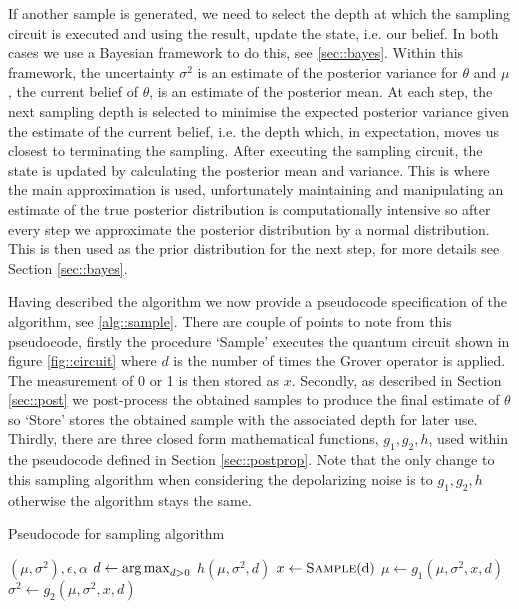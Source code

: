 If another sample is generated, we need to select the depth at which the sampling circuit is executed and using the result, update the state, i.e. our belief. In both cases we use a Bayesian framework to do this, see \ref{sec::bayes}. Within this framework, the uncertainty $\sigma^2$ is an estimate of the posterior variance for $\theta$ and $\mu$, the current belief of $\theta$, is an estimate of the posterior mean. At each step, the next sampling depth is selected to minimise the expected posterior variance given the estimate of the current belief, i.e. the depth which, in expectation, moves us closest to terminating the sampling. After executing the sampling circuit, the state is updated by calculating the posterior mean and variance. This is where the main approximation is used, unfortunately maintaining and manipulating an estimate of the true posterior distribution is computationally intensive so after every step we approximate the posterior distribution by a normal distribution. This is then used as the prior distribution for the next step, for more details see Section \ref{sec::bayes}.

Having described the algorithm we now provide a pseudocode specification of the algorithm, see \ref{alg::sample}. There are couple of points to note from this pseudocode, firstly the procedure `Sample' executes the quantum circuit shown in figure \ref{fig::circuit} where $d$ is the number of times the Grover operator is applied. The measurement of 0 or 1 is then stored as $x$. Secondly, as described in Section \ref{sec::post} we post-process the obtained samples to produce the final estimate of $\theta$ so `Store' stores the obtained sample with the associated depth for later use. Thirdly, there are three closed form mathematical functions, $g_1,g_2,h$, used within the pseudocode defined in Section \ref{sec::postprop}. Note that the only change to this sampling algorithm when considering the depolarizing noise is to $g_1,g_2,h$ otherwise the algorithm stays the same.

\begin{algorithm}
	\caption{Pseudocode for sampling algorithm }\label{alg::sample}
	\begin{algorithmic}
		\Require $(\mu, \sigma^2), \epsilon, \alpha$
		 
		\State $d \gets \operatorname*{arg\,max}_{d>0} $ $ h(\mu,\sigma^2,d)$ 
		\State $x\gets \Call{Sample}{$d$}$
		\State $\mu \gets g_1(\mu,\sigma^2,x,d)$
		\State $\sigma^2 \gets g_2(\mu,\sigma^2,x,d)$ 
		\State {} 
		\EndWhile
	\end{algorithmic}
\end{algorithm}

